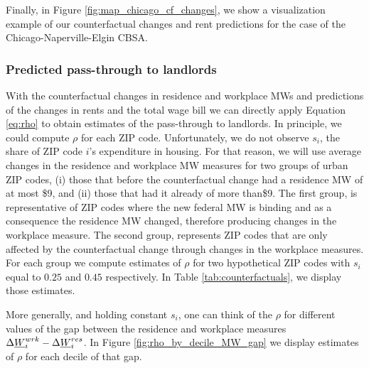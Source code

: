 

Finally, in Figure \ref{fig:map_chicago_cf_changes}, we show a visualization example 
of our counterfactual changes and rent predictions for the case of the 
Chicago-Naperville-Elgin CBSA. 


\subsubsection{Predicted pass-through to landlords}\label{sec:rho}

With the counterfactual changes in residence and workplace MWs and predictions of 
the changes in rents and the total wage bill we can directly apply Equation \ref{eq:rho} 
to obtain estimates of the pass-through to landlords. In principle, we could compute $\rho$ 
for each ZIP code. Unfortunately, we do not observe $s_i$, the share of ZIP code $i$'s 
expenditure in housing. For that reason, we will use average changes in the residence and 
workplace MW measures for two groups of urban ZIP codes, (i) those that before the counterfactual 
change had a residence MW of at most \$9, and (ii) those that had it already of more than\$9. The 
first group, is representative of ZIP codes where the new federal MW is binding and as a consequence 
the residence MW changed, therefore producing changes in the workplace measure. The second group, 
represents ZIP codes that are only affected by the counterfactual change through changes in the 
workplace measures.
For each group we compute estimates of $\rho$ for two hypothetical ZIP codes with $s_i$ equal to 
$0.25$ and $0.45$ respectively. In Table \ref{tab:counterfactuals}, we display those estimates.


More generally, and holding constant $s_i$, one can think of the $\rho$ for different values
of the gap between the residence and workplace measures $\Delta \underline{W}_i^{wrk} - \Delta \underline{W}_i^{res}$.
In Figure \ref{fig:rho_by_decile_MW_gap} we display estimates of $\rho$ for each decile of that gap.



